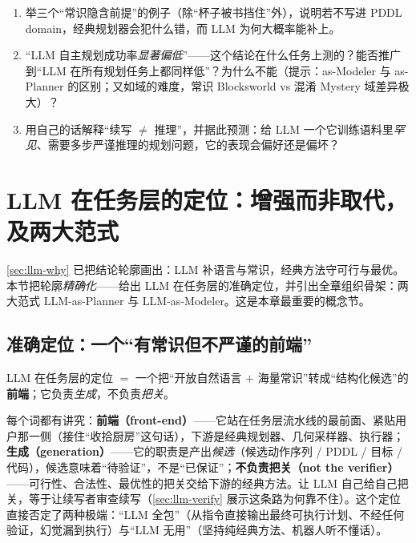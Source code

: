 \begin{exercise}
\begin{enumerate}
  \item 举三个“常识隐含前提”的例子（除“杯子被书挡住”外），说明若不写进 PDDL domain，经典规划器会犯什么错，而 LLM 为何大概率能补上。
  \item “LLM 自主规划成功率\emph{显著偏低}”——这个结论在什么任务上测的？能否推广到“LLM 在所有规划任务上都同样低”？为什么不能（提示：as-Modeler 与 as-Planner 的区别；又如域的难度，常识 Blocksworld vs 混淆 Mystery 域差异极大）？
  \item 用自己的话解释“续写 $\neq$ 推理”，并据此预测：给 LLM 一个它训练语料里\emph{罕见}、需要多步严谨推理的规划问题，它的表现会偏好还是偏坏？
\end{enumerate}
\end{exercise}

\section{LLM 在任务层的定位：增强而非取代，及两大范式}
\label{sec:llm-position}

\cref{sec:llm-why} 已把结论轮廓画出：LLM 补语言与常识，经典方法守可行与最优。本节把轮廓\emph{精确化}——给出 LLM 在任务层的准确定位，并引出全章组织骨架：两大范式 LLM-as-Planner 与 LLM-as-Modeler。这是本章最重要的概念节。

\subsection{准确定位：一个“有常识但不严谨的前端”}
\label{sec:llm-position-def}

\begin{definition}
\label{def:llm-position}
LLM 在任务层的定位 $=$ 一个把“开放自然语言 $+$ 海量常识”转成“结构化候选”的\textbf{前端}；它负责\emph{生成}，不负责\emph{把关}。
\end{definition}

\noindent 每个词都有讲究：\textbf{前端（front-end）}——它站在任务层流水线的最前面、紧贴用户那一侧（接住“收拾厨房”这句话），下游是经典规划器、几何采样器、执行器；\textbf{生成（generation）}——它的职责是产出\emph{候选}（候选动作序列 / PDDL / 目标 / 代码），候选意味着“待验证”，不是“已保证”；\textbf{不负责把关（not the verifier）}——可行性、合法性、最优性的把关交给下游的经典方法。让 LLM 自己给自己把关，等于让续写者审查续写（\cref{sec:llm-verify} 展示这条路为何靠不住）。这个定位直接否定了两种极端：“LLM 全包”（从指令直接输出最终可执行计划、不经任何验证，幻觉漏到执行）与“LLM 无用”（坚持纯经典方法、机器人听不懂话）。

